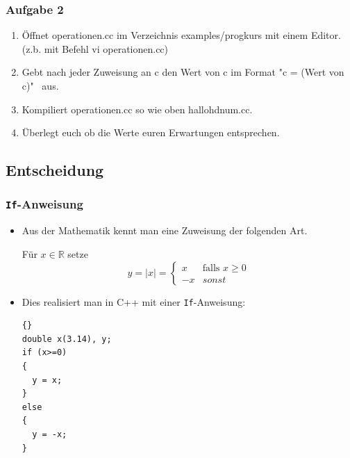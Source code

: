 \documentclass[ignorenonframetext,12pt]{beamer}
\theoremstyle{definition}
\theoremstyle{definition}
\begin{document}
\begin{frame}[fragile]
\frametitle{Aufgabe 2}
\begin{enumerate}
\item Öffnet operationen.cc im Verzeichnis examples/progkurs mit einem Editor. (z.b. mit Befehl vi operationen.cc)
\item Gebt nach jeder Zuweisung an c den Wert von c im Format "c = (Wert von c)" \ aus.
\item Kompiliert operationen.cc so wie oben hallohdnum.cc.
\item Überlegt euch ob die Werte euren Erwartungen entsprechen.
\end{enumerate}
\end{frame}

\subsection{Entscheidung}

\begin{frame}[fragile]
\frametitle{\lstinline{If}-Anweisung}
\begin{itemize}
\item Aus der Mathematik kennt man eine \glqq{}Zuweisung\grqq{} der
  folgenden Art.

Für $x\in\mathbb{R}$ setze
\begin{equation*}
y = |x| = \left\{\begin{array}{ll}
x & \text{falls $x\geq 0$}\\
-x & sonst
\end{array}\right.
\end{equation*}
\item Dies realisiert man in C++ mit einer \lstinline{If}-Anweisung:
{\scriptsize\begin{lstlisting}{}
double x(3.14), y;
if (x>=0)
{
  y = x;
}
else
{
  y = -x;
}
\end{lstlisting}}
\end{itemize}
\end{frame}
\end{document}
